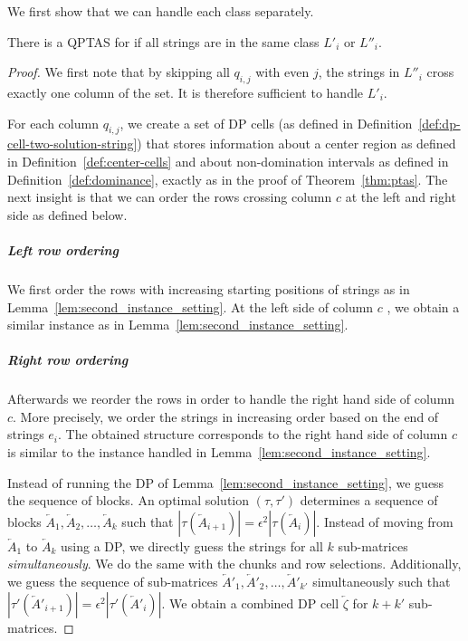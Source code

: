 We first show that we can handle each class separately.
\begin{lemma}\label{lem:half-length-class}
    There is a QPTAS for \GMEC if all strings are in the same class $L'_i$ or $L''_i$.
\end{lemma}
\begin{proof}
    We first note that by skipping all $q_{i,j}$ with even $j$, the strings in $L''_i$ cross exactly one column of the set.
    It is therefore sufficient to handle $L'_i$.

    For each column $q_{i,j}$, we create a set of DP cells (as defined in Definition~\ref{def:dp-cell-two-solution-string}) that stores information about a center region as defined in Definition~\ref{def:center-cells} and about non-domination intervals as defined in Definition~\ref{def:dominance}, exactly as in the proof of Theorem~\ref{thm:ptas}. 
    The next insight is that we can order the rows crossing column $c$ at the left and right side as defined below.
    \subparagraph{Left row ordering}
    We first order the rows with increasing starting positions of strings as in Lemma~\ref{lem:second_instance_setting}.
    At the left side of column $c$ , we obtain a similar instance as in Lemma~\ref{lem:second_instance_setting}.

    \subparagraph{Right row ordering}
    Afterwards we reorder the rows in order to handle the right hand side of column $c$. More precisely, we order the strings in increasing order based on the end of strings $e_i$.
    The obtained structure corresponds to the right hand side of column $c$ is similar to the instance handled in Lemma~\ref{lem:second_instance_setting}.

    Instead of running the DP of Lemma~\ref{lem:second_instance_setting}, we guess the sequence of blocks.
    An optimal solution $(\tau,\tau')$ determines a sequence of blocks $\overleftarrow{A}_1,\overleftarrow{A}_2,\dotsc,\overleftarrow{A}_k$ such that $|\tau(\overleftarrow{A}_{i+1})| =  \epsilon^2 |\tau(\overleftarrow{A}_{i})|$. 
    Instead of moving from $\overleftarrow{A}_1$ to $\overleftarrow{A}_k$ using a DP, we directly guess the strings for all $k$ sub-matrices \emph{simultaneously}.
    We do the same with the chunks and row selections.
    Additionally, we guess the sequence of sub-matrices $\overleftarrow{A}'_1,\overleftarrow{A}'_2,\dotsc,\overleftarrow{A}'_{k'}$ simultaneously 
    such that $|\tau'(\overleftarrow{A}'_{i+1})| =  \epsilon^2 |\tau'(\overleftarrow{A}'_{i})|$.
    We obtain a combined DP cell $\overleftarrow{\zeta}$ for $k+k'$ sub-matrices.


\end{proof}
